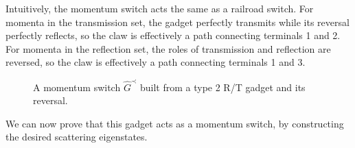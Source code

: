 \documentclass[../thesis-main/thesis-main]{subfiles}
\begin{document}
Intuitively, the momentum switch acts the same as a railroad switch.  For momenta in the transmission set, the gadget perfectly transmits while its reversal perfectly reflects, so the claw is effectively a path connecting terminals 1 and 2.  For momenta in the reflection set, the roles of transmission and reflection are reversed, so the claw is effectively a path connecting terminals 1 and 3.

\begin{figure}
  \centering
  
  \caption{A momentum switch $\hat G^\prec$ built from a type 2 R/T gadget and its reversal.}
  \label{fig:gen_mom_con}
\end{figure}

We can now prove that this gadget acts as a momentum switch, by constructing the desired scattering eigenstates.
\end{document}
